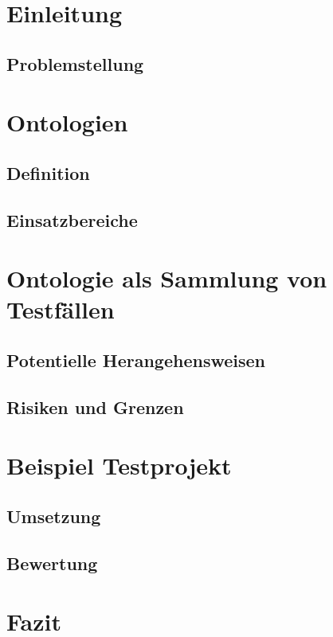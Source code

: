 \chapter{Einleitung}
\section{Problemstellung}
\chapter{Ontologien}
\section{Definition}
\section{Einsatzbereiche}
\chapter{Ontologie als Sammlung von Testfällen}
\section{Potentielle Herangehensweisen}
\section{Risiken und Grenzen}
\chapter{Beispiel Testprojekt}
\section{Umsetzung}
\section{Bewertung}
\chapter{Fazit}